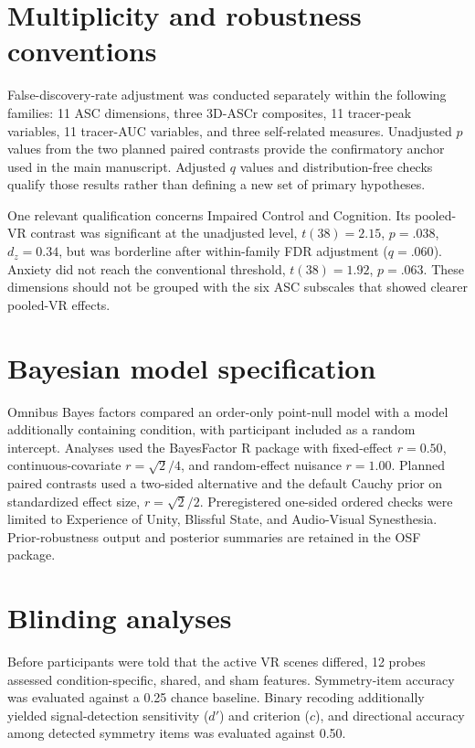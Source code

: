 \documentclass[pdflatex,sn-mathphys-num]{sn-jnl}
\begin{document}
\section{Multiplicity and robustness conventions}

False-discovery-rate adjustment was conducted separately within the following families: 11 ASC dimensions, three 3D-ASCr composites, 11 tracer-peak variables, 11 tracer-AUC variables, and three self-related measures. Unadjusted $p$ values from the two planned paired contrasts provide the confirmatory anchor used in the main manuscript. Adjusted $q$ values and distribution-free checks qualify those results rather than defining a new set of primary hypotheses.

One relevant qualification concerns Impaired Control and Cognition. Its pooled-VR contrast was significant at the unadjusted level, $t(38)=2.15$, $p=.038$, $d_z=0.34$, but was borderline after within-family FDR adjustment ($q=.060$). Anxiety did not reach the conventional threshold, $t(38)=1.92$, $p=.063$. These dimensions should not be grouped with the six ASC subscales that showed clearer pooled-VR effects.

\section{Bayesian model specification}

Omnibus Bayes factors compared an order-only point-null model with a model additionally containing condition, with participant included as a random intercept. Analyses used the BayesFactor R package with fixed-effect $r=0.50$, continuous-covariate $r=\sqrt{2}/4$, and random-effect nuisance $r=1.00$. Planned paired contrasts used a two-sided alternative and the default Cauchy prior on standardized effect size, $r=\sqrt{2}/2$. Preregistered one-sided ordered checks were limited to Experience of Unity, Blissful State, and Audio-Visual Synesthesia. Prior-robustness output and posterior summaries are retained in the OSF package.

\section{Blinding analyses}

Before participants were told that the active VR scenes differed, 12 probes assessed condition-specific, shared, and sham features. Symmetry-item accuracy was evaluated against a 0.25 chance baseline. Binary recoding additionally yielded signal-detection sensitivity ($d'$) and criterion ($c$), and directional accuracy among detected symmetry items was evaluated against 0.50.
\end{document}
